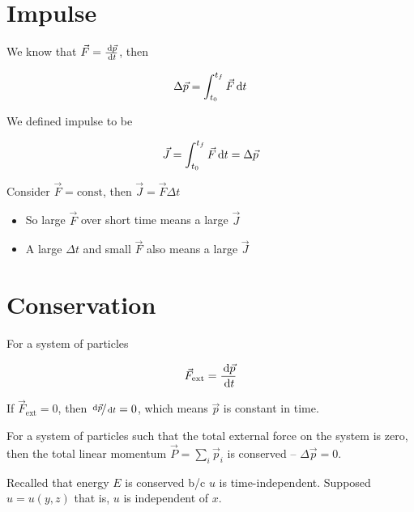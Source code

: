\section{Impulse}

We know that $\vec F = \frac{\D \vec p}{\D t}$, then

\begin{equation}
	\Delta \vec p = \int_{t_0}^{t_f} \vec F \D t
\end{equation}

\begin{definition}
	We defined impulse to be

	\begin{equation}
		\vec J = \int_{t_0}^{t_f} \vec F \D t = \Delta \vec p
	\end{equation}
\end{definition}

\begin{remark}
	Consider $\vec F = \mathrm{const}$, then $\vec J = \vec F \Delta t$

	\begin{itemize}
		\item So large $\vec F$ over short time means a large $\vec J$
		\item A large $\Delta t$ and small $\vec F$ also means a large $\vec J$
	\end{itemize}
\end{remark}

\section{Conservation}

For a system of particles

\begin{equation}
	\vec F_\mathrm{ext} = \frac{\D \vec p}{\D t}
\end{equation}

If $\vec F_\mathrm{ext} = 0$, then $\nicefrac{\D \vec p}{\D t} = 0$, which means $\vec p$ is constant in time.

\begin{definition}
	For a system of particles such that the total external force on the system is zero, then the total linear momentum $\vec P = \sum_i \vec p_i$ is conserved -- $\Delta \vec p = 0$.
\end{definition}

Recalled that energy $E$ is conserved b/c $u$ is time-independent. Supposed $u = u(y, z)$ that is, $u$ is independent of $x$.

